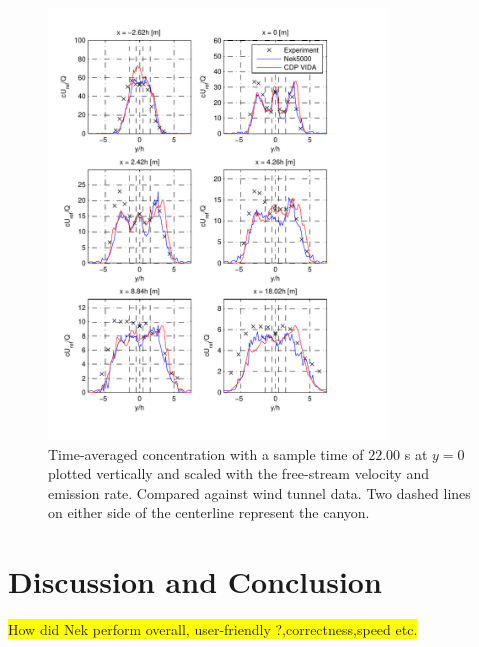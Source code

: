\begin{figure}[h]
	\centering
	\includegraphics[width=0.8\textwidth]{Figures/Nek_smag_cfluctH.pdf}
	\caption{Time-averaged concentration with a sample time of $22.00$ s at $y = 0$ plotted
    vertically and scaled 
	with the free-stream velocity and emission rate. Compared against wind tunnel data.
Two dashed lines on either side of the centerline represent the canyon.}
	\label{fig:cVsmag}
\end{figure}
%

\section{Discussion and Conclusion}
\colorbox{yellow}{How did Nek perform overall, user-friendly ?,correctness,speed etc.}

